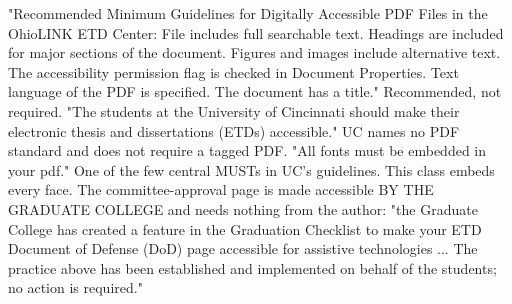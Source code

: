 

%
	{"Recommended Minimum Guidelines for Digitally Accessible PDF Files in the
	 OhioLINK ETD Center: File includes full searchable text. Headings are
	 included for major sections of the document. Figures and images include
	 alternative text. The accessibility permission flag is checked in Document
	 Properties. Text language of the PDF is specified. The document has a
	 title."}
	{Recommended, not required. "The students at the University of Cincinnati
	 should make their electronic thesis and dissertations (ETDs) accessible."
	 UC names no PDF standard and does not require a tagged PDF.}
	{"All fonts must be embedded in your pdf." One of the few central MUSTs in
	 UC's guidelines. This class embeds every face.}
	{The committee-approval page is made accessible BY THE GRADUATE COLLEGE and
	 needs nothing from the author: "the Graduate College has created a feature
	 in the Graduation Checklist to make your ETD Document of Defense (DoD) page
	 accessible for assistive technologies ... The practice above has been
	 established and implemented on behalf of the students; no action is
	 required."}

